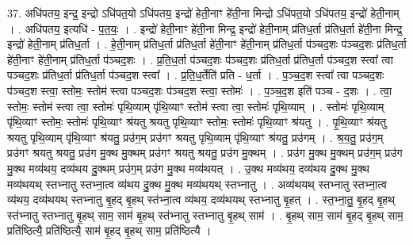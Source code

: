 \documentclass[17pt]{extarticle}
\begin{document}
37. अधि॑पतय॒ इन्द्र॒ इन्द्रो ऽधि॑पत॒यो ऽधि॑पतय॒ इन्द्रो॑ हेती॒नाꣳ हे॑ती॒ना मिन्द्रो ऽधि॑पत॒यो ऽधि॑पतय॒ इन्द्रो॑ हेती॒नाम् । . अधि॑पतय॒ इत्यधि॑ - प॒त॒यः॒ । . इन्द्रो॑ हेती॒नाꣳ हे॑ती॒ना मिन्द्र॒ इन्द्रो॑ हेती॒नाम् प्र॑तिध॒र्ता प्र॑तिध॒र्ता हे॑ती॒ना मिन्द्र॒ इन्द्रो॑ हेती॒नाम् प्र॑तिध॒र्ता । . हे॒ती॒नाम् प्र॑तिध॒र्ता प्र॑तिध॒र्ता हे॑ती॒नाꣳ हे॑ती॒नाम् प्र॑तिध॒र्ता प॑ञ्चद॒शः प॑ञ्चद॒शः प्र॑तिध॒र्ता हे॑ती॒नाꣳ हे॑ती॒नाम् प्र॑तिध॒र्ता प॑ञ्चद॒शः । . प्र॒ति॒ध॒र्ता प॑ञ्चद॒शः प॑ञ्चद॒शः प्र॑तिध॒र्ता प्र॑तिध॒र्ता प॑ञ्चद॒श स्त्वा᳚ त्वा पञ्चद॒शः प्र॑तिध॒र्ता प्र॑तिध॒र्ता प॑ञ्चद॒श स्त्वा᳚ । . प्र॒ति॒ध॒र्तेति॑ प्रति - ध॒र्ता । . प॒ञ्च॒द॒श स्त्वा᳚ त्वा पञ्चद॒शः प॑ञ्चद॒श स्त्वा॒ स्तोमः॒ स्तोम॑ स्त्वा पञ्चद॒शः प॑ञ्चद॒श स्त्वा॒ स्तोमः॑ । . प॒ञ्च॒द॒श इति॑ पञ्च - द॒शः । . त्वा॒ स्तोमः॒ स्तोम॑ स्त्वा त्वा॒ स्तोमः॑ पृथि॒व्याम् पृ॑थि॒व्याꣳ स्तोम॑ स्त्वा त्वा॒ स्तोमः॑ पृथि॒व्याम् । . स्तोमः॑ पृथि॒व्याम् पृ॑थि॒व्याꣳ स्तोमः॒ स्तोमः॑ पृथि॒व्याꣳ श्र॑यतु श्रयतु पृथि॒व्याꣳ स्तोमः॒ स्तोमः॑ पृथि॒व्याꣳ श्र॑यतु । . पृ॒थि॒व्याꣳ श्र॑यतु श्रयतु पृथि॒व्याम् पृ॑थि॒व्याꣳ श्र॑यतु॒ प्र‌उ॑ग॒म् प्र‌उ॑गꣳ श्रयतु पृथि॒व्याम् पृ॑थि॒व्याꣳ श्र॑यतु॒ प्र‌उ॑गम् । . श्र॒य॒तु॒ प्र‌उ॑ग॒म् प्र‌उ॑गꣳ श्रयतु श्रयतु॒ प्र‌उ॑ग मु॒क्थ मु॒क्थम् प्र‌उ॑गꣳ श्रयतु श्रयतु॒ 
प्र‌उ॑ग मु॒क्थम् । . प्र‌उ॑ग मु॒क्थ मु॒क्थम् प्र‌उ॑ग॒म् प्र‌उ॑ग मु॒क्थ मव्य॑थय॒ दव्य॑थय दु॒क्थम् प्र‌उ॑ग॒म् 
प्र‌उ॑ग मु॒क्थ मव्य॑थयत् । . उ॒क्थ मव्य॑थय॒ दव्य॑थय दु॒क्थ मु॒क्थ मव्य॑थयथ् स्तभ्नातु स्तभ्ना॒त्व व्य॑थय दु॒क्थ मु॒क्थ मव्य॑थयथ् स्तभ्नातु । . अव्य॑थयथ् स्तभ्नातु स्तभ्ना॒त्व व्य॑थय॒ दव्य॑थयथ् स्तभ्नातु बृ॒हद् बृ॒हथ् स्त॑भ्ना॒त्व व्य॑थय॒ दव्य॑थयथ् स्तभ्नातु बृ॒हत् । . स्त॒भ्ना॒तु॒ बृ॒हद् बृ॒हथ् स्त॑भ्नातु स्तभ्नातु बृ॒हथ् साम॒ साम॑ बृ॒हथ् स्त॑भ्नातु स्तभ्नातु बृ॒हथ् साम॑ । . बृ॒हथ् साम॒ साम॑ बृ॒हद् बृ॒हथ् साम॒ प्रति॑ष्ठित्यै॒ प्रति॑ष्ठित्यै॒ साम॑ बृ॒हद् बृ॒हथ् साम॒ प्रति॑ष्ठित्यै । \newline
\end{document}

